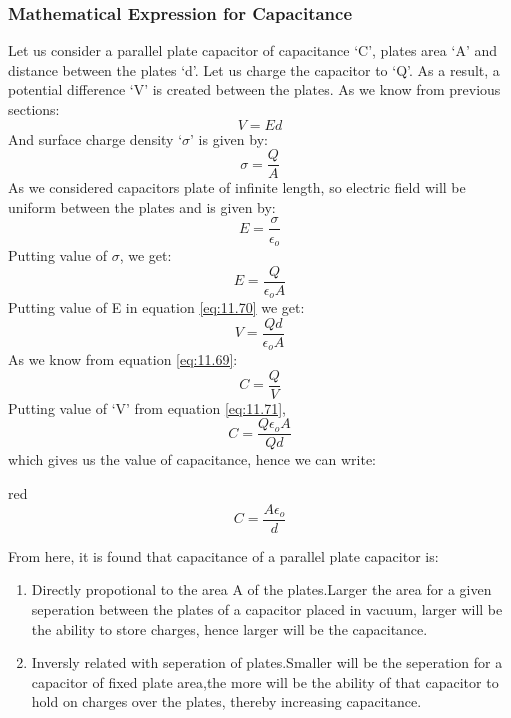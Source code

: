 \subsubsection{Mathematical Expression for Capacitance}
Let us consider a parallel plate capacitor of capacitance ‘C’,
plates area ‘A’ and distance between the plates ‘d’. Let us charge the
capacitor to ‘Q’. As a result, a potential difference ‘V’
is created between the plates. 
As we know from previous sections:
\begin{equation}\label{eq:11.70}
  V = Ed
\end{equation}
And surface charge density `$\sigma$' is given by:
\begin{equation}\nonumber
  \sigma = \frac{Q}{A}
\end{equation}
As we considered capacitors plate of infinite length, so 
electric field will be uniform between the plates and is given by:
\begin{equation}\nonumber
  E = \frac{\sigma}{\epsilon_{o}}
\end{equation}
Putting value of $\sigma$, we get:
\begin{equation}\nonumber
  E = \frac{Q}{\epsilon_{o}A}
\end{equation}
Putting value of E in equation \ref{eq:11.70} we get:
\begin{equation}\label{eq:11.71}
  V = \frac{Qd}{\epsilon_{o}A}
\end{equation}
As we know from equation \ref{eq:11.69}:
\begin{equation}\nonumber
  C =  \frac{Q}{V}
\end{equation}
Putting value of `V' from equation \ref{eq:11.71}, 
\begin{equation}\nonumber
  C =  \frac{Q\epsilon_{o}A}{Qd}
\end{equation}
which gives us the value of capacitance,
hence we can write:
\begin{mybox}{red}{}
  \begin{equation}\label{eq:11.72}
    C =  \frac{A\epsilon_{o}}{d}
  \end{equation}
\end{mybox}
\noindent From here, it is found that capacitance of a parallel plate capacitor is:
\begin{enumerate}[label = (\alph*)]
\item Directly propotional to the area A of the plates.Larger the area for a
given seperation between the plates of a capacitor placed in vacuum,
larger will be the ability to store charges, hence larger will be
the capacitance.
\item Inversly related with seperation of plates.Smaller will be the seperation
for a capacitor of fixed plate area,the more will be the ability of that
capacitor to hold on charges over the plates,
thereby increasing capacitance.
\end{enumerate}
